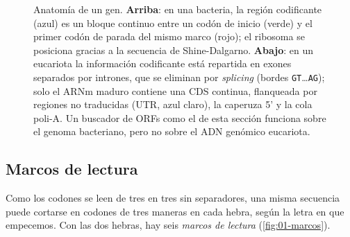 \begin{figure}[t]
\caption[Estructura de un gen procariota y uno eucariota]{Anatomía de un gen. \textbf{Arriba}: en una bacteria, la región codificante (azul) es un bloque continuo entre un codón de inicio (verde) y el primer codón de parada del mismo marco (rojo); el ribosoma se posiciona gracias a la secuencia de Shine-Dalgarno. \textbf{Abajo}: en un eucariota la información codificante está repartida en exones separados por intrones, que se eliminan por \emph{splicing} (bordes \texttt{GT}\ldots\texttt{AG}); solo el ARNm maduro contiene una CDS continua, flanqueada por regiones no traducidas (UTR, azul claro), la caperuza 5' y la cola poli-A. Un buscador de ORFs como el de esta sección funciona sobre el genoma bacteriano, pero no sobre el ADN genómico eucariota.}
\label{fig:01-genes}
\end{figure}

\subsection{Marcos de lectura}

Como los codones se leen de tres en tres sin separadores, una misma secuencia puede cortarse en codones de tres maneras en cada hebra, según la letra en que empecemos. Con las dos hebras, hay seis \emph{marcos de lectura} (\cref{fig:01-marcos}).

